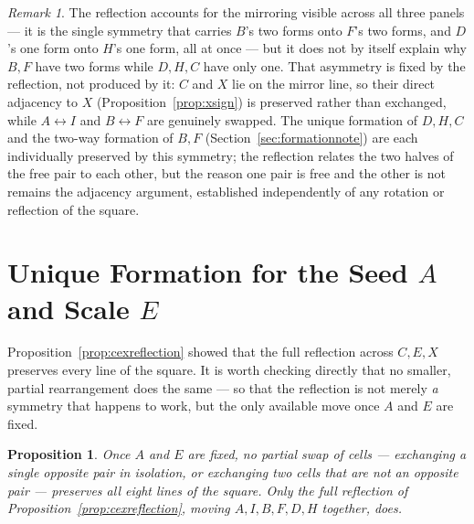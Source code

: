 \documentclass[12pt]{article}
\newtheorem{proposition}[theorem]{Proposition}
\theoremstyle{remark}
\newtheorem{remark}[theorem]{Remark}
\begin{document}
\begin{remark}
The reflection accounts for the mirroring visible across all three
panels --- it is the single symmetry that carries $B$'s two forms onto
$F$'s two forms, and $D$'s one form onto $H$'s one form, all at once
--- but it does not by itself explain why $B,F$ have two forms while
$D,H,C$ have only one. That asymmetry is fixed by the reflection, not
produced by it: $C$ and $X$ lie on the mirror line, so their direct
adjacency to $X$ (Proposition~\ref{prop:xsign}) is preserved rather
than exchanged, while $A\leftrightarrow I$ and $B\leftrightarrow F$
are genuinely swapped. The unique formation of $D,H,C$ and the
two-way formation of $B,F$ (Section~\ref{sec:formationnote}) are each
individually preserved by this symmetry; the reflection relates the
two halves of the free pair to each other, but the reason one pair is
free and the other is not remains the adjacency argument, established
independently of any rotation or reflection of the square.
\end{remark}

\section{Unique Formation for the Seed $A$ and Scale $E$}\label{sec:uniqueformation}

Proposition~\ref{prop:cexreflection} showed that the full reflection
across $C,E,X$ preserves every line of the square. It is worth
checking directly that no smaller, partial rearrangement does the
same --- so that the reflection is not merely \emph{a} symmetry that
happens to work, but the only available move once $A$ and $E$ are
fixed.

\begin{proposition}\label{prop:nopartial}
Once $A$ and $E$ are fixed, no partial swap of cells --- exchanging a
single opposite pair in isolation, or exchanging two cells that are
not an opposite pair --- preserves all eight lines of the square.
Only the full reflection of Proposition~\ref{prop:cexreflection},
moving $A,I,B,F,D,H$ together, does.
\end{proposition}
\end{document}
